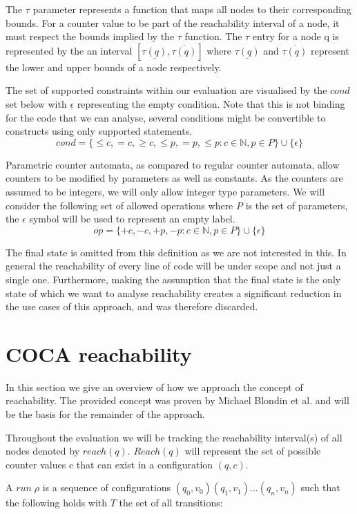 \documentclass[12pt]{thesis}
\begin{document}
The $\tau$ parameter represents a function that maps all nodes to their corresponding bounds. For a counter value to be part of the reachability interval of a node, it must respect the bounds implied by the $\tau$ function. The $\tau$ entry for a node q is represented by the an interval $[\underline{\tau(q)}, \overline{\tau(q)}]$ where $\underline{\tau(q)}$ and $\overline{\tau(q)}$ represent the lower and upper bounds of a node respectively.

The set of supported constraints within our evaluation are visualised by the $cond$ set below with $\epsilon$ representing the empty condition. Note that this is not binding for the code that we can analyse, several conditions might be convertible to constructs using only supported statements.
\[
cond = \{\leq c, =c, \geq c, \leq p, =p, \leq p: c \in \mathbb{N}, p \in P\} \cup \{\epsilon\}
\]

Parametric counter automata, as compared to regular counter automata, allow counters to be modified by parameters as well as constants. As the counters are assumed to be integers, we will only allow integer type parameters. We will consider the following set of allowed operations where $P$ is the set of parameters, the $\epsilon$ symbol will be used to represent an empty label.
\[
op = \{+c, -c, +p, -p: c \in \mathbb{N}, p \in P\} \cup \{\epsilon\}
\]

The final state is omitted from this definition as we are not interested in this. In general the reachability of every line of code will be under scope and not just a single one. Furthermore, making the assumption that the final state is the only state of which we want to analyse reachability creates a significant reduction in the use cases of this approach, and was therefore discarded.

\section{COCA reachability}
In this section we give an overview of how we approach the concept of reachability. The provided concept was proven by Michael Blondin et al. \cite{blondin2021continuous} and will be the basis for the remainder of the approach.

Throughout the evaluation we will be tracking the reachability interval(s) of all nodes denoted by $reach(q)$. $Reach(q)$ will represent the set of possible counter values c that can exist in a configuration $(q, c)$.

A $run\;\rho$ is a sequence of configurations $(q_0, v_0)(q_1, v_1)...(q_n, v_n)$ such that the following holds with $T$ the set of all transitions:
\end{document}
